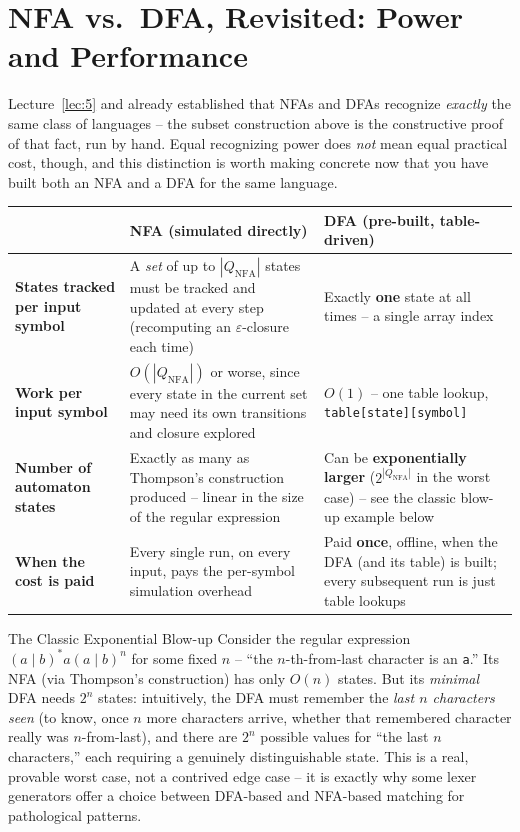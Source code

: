 \documentclass[full-course-notes.tex]{subfiles}
\begin{document}
\section{NFA vs.\ DFA, Revisited: Power and Performance}
\label{sec:l6-nfa-vs-dfa-tradeoffs}

\dbtag Lecture~\ref{lec:5} and  already established that NFAs
and DFAs recognize \emph{exactly} the same class of languages -- the subset construction above
is the constructive proof of that fact, run by hand. Equal recognizing power does \emph{not}
mean equal practical cost, though, and this distinction is worth making concrete now that you
have built both an NFA and a DFA for the same language.

\begin{center}
\renewcommand{\arraystretch}{1.4}
\begin{tabularx}{\textwidth}{@{}l X X@{}}
\toprule
 & \textbf{NFA (simulated directly)} & \textbf{DFA (pre-built, table-driven)} \\
\midrule
\textbf{States tracked per input symbol} & A \emph{set} of up to $|Q_{\text{NFA}}|$ states must
be tracked and updated at every step (recomputing an $\varepsilon$-closure each time) &
Exactly \textbf{one} state at all times -- a single array index \\
\textbf{Work per input symbol} & $O(|Q_{\text{NFA}}|)$ or worse, since every state in the
current set may need its own transitions and closure explored & $O(1)$ -- one table lookup,
\texttt{table[state][symbol]} \\
\textbf{Number of automaton states} & Exactly as many as Thompson's construction produced --
linear in the size of the regular expression & Can be \textbf{exponentially larger}
($2^{|Q_{\text{NFA}}|}$ in the worst case) -- see the classic blow-up example below \\
\textbf{When the cost is paid} & Every single run, on every input, pays the per-symbol
simulation overhead & Paid \textbf{once}, offline, when the DFA (and its table) is built; every
subsequent run is just table lookups \\
\bottomrule
\end{tabularx}
\end{center}

\begin{examplebox}{The Classic Exponential Blow-up}
Consider the regular expression $(a\mid b)^{*}a(a\mid b)^{n}$ for some fixed $n$ -- ``the
$n$-th-from-last character is an \texttt{a}.'' Its NFA (via Thompson's construction) has only
$O(n)$ states. But its \emph{minimal} DFA needs $2^{n}$ states: intuitively, the DFA must
remember the \emph{last $n$ characters seen} (to know, once $n$ more characters arrive, whether
that remembered character really was $n$-from-last), and there are $2^{n}$ possible values for
``the last $n$ characters,'' each requiring a genuinely distinguishable state. This is a real,
provable worst case, not a contrived edge case -- it is exactly why some lexer generators offer
a choice between DFA-based and NFA-based matching for pathological patterns.
\end{examplebox}
\end{document}
